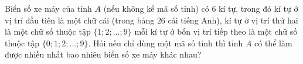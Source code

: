 \begin{ex}%
	Biển số xe máy của tỉnh $A$ (nếu không kể mã số tỉnh) có $6$ kí tự, trong đó kí tự ở vị trí đầu tiên là một chữ cái (trong bảng $26$ cái tiếng Anh), kí tự ở vị trí thứ hai là một chữ số thuộc tập $\{1; 2; \ldots; 9\}$ mỗi kí tự ở bốn vị trí tiếp theo là một chữ số thuộc tập $\{0; 1; 2; \ldots; 9\}$. Hỏi nếu chỉ dùng một mã số tỉnh thì tỉnh $A$ có thể làm được nhiều nhất bao nhiêu biển số xe máy khác nhau?
\end{ex}
